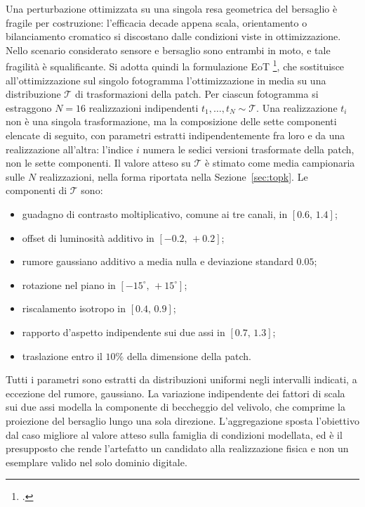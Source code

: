\ifstampa\documentclass[a4paper,12pt,twoside,openright]{report}\else\documentclass[a4paper,12pt]{report}\fi
\newif\ifrevisione \revisionefalse
\DeclareRobustCommand{\rev}[1]{\ifrevisione{\color{blue!65!black}#1}\else#1\fi}
\begin{document}
Una perturbazione ottimizzata su una singola resa geometrica del bersaglio è
fragile per costruzione: l'efficacia decade appena scala, orientamento o
bilanciamento cromatico si discostano dalle condizioni viste in ottimizzazione.
Nello scenario considerato sensore e bersaglio sono entrambi in moto, e tale
fragilità è squalificante. Si adotta quindi la formulazione \rev{EoT} \footcite{athalye_2018_eot}, che sostituisce
all'ottimizzazione sul singolo fotogramma \rev{l'ottimizzazione in media su una
distribuzione $\mathcal{T}$ di trasformazioni della patch. Per ciascun
fotogramma si estraggono $N = 16$ realizzazioni indipendenti
$t_1, \dots, t_N \sim \mathcal{T}$. Una realizzazione $t_i$ non è una singola
trasformazione, ma la composizione delle sette componenti elencate di seguito,
con parametri estratti indipendentemente fra loro e da una realizzazione
all'altra: l'indice $i$ numera le sedici versioni trasformate della patch, non
le sette componenti. Il valore atteso su $\mathcal{T}$ è stimato come media
campionaria sulle $N$ realizzazioni, nella forma riportata nella
Sezione~\ref{sec:topk}. Le componenti di $\mathcal{T}$ sono:}
\begin{itemize}
    \item \rev{guadagno di contrasto moltiplicativo, comune ai tre canali, in $[0.6,\, 1.4]$};
    \item offset di luminosità additivo in $[-0.2,\, +0.2]$;
    \item rumore gaussiano additivo a media nulla e deviazione standard $0.05$;
    \item rotazione nel piano in $[-15^\circ,\, +15^\circ]$;
    \item riscalamento isotropo in $[0.4,\, 0.9]$;
    \item rapporto d'aspetto indipendente sui due assi in $[0.7,\, 1.3]$;
    \item traslazione entro il $10\%$ della dimensione della \rev{patch}.
\end{itemize}
\rev{Tutti i parametri sono estratti da distribuzioni uniformi negli intervalli
indicati, a eccezione del rumore, gaussiano.}
La variazione indipendente dei fattori di scala sui due assi modella la
componente di beccheggio del velivolo, che comprime la proiezione del bersaglio
lungo una sola direzione. L'aggregazione sposta l'obiettivo dal caso migliore al
valore atteso sulla famiglia di condizioni modellata, ed è il presupposto che
rende l'artefatto un candidato alla realizzazione fisica e non un esemplare
valido nel solo dominio digitale.
\end{document}
